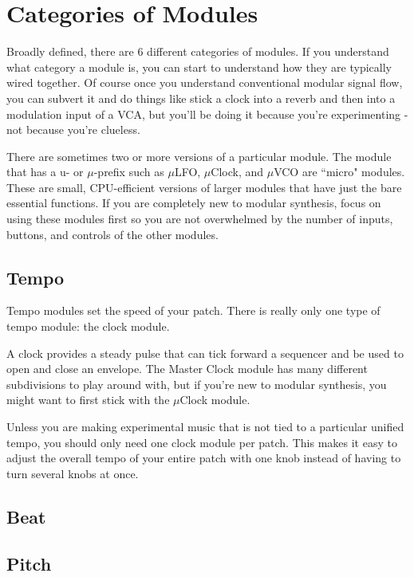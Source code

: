\documentclass[11pt]{book}
\begin{document}
\section{Categories of Modules}

Broadly defined, there are 6 different categories of modules. If you understand what category a module is, you can start to understand how they are typically wired together. Of course once you understand conventional modular signal flow, you can subvert it and do things like stick a clock into a reverb and then into a modulation input of a VCA, but you'll be doing it because you're experimenting - not because you're clueless.

There are sometimes two or more versions of a particular module. The module that has a u- or $\mu$-prefix such as $\mu$LFO, $\mu$Clock, and $\mu$VCO are ``micro" modules. These are small, CPU-efficient versions of larger modules that have just the bare essential functions. If you are completely new to modular synthesis, focus on using these modules first so you are not overwhelmed by the number of inputs, buttons, and controls of the other modules.

\subsection{Tempo}

Tempo modules set the speed of your patch. There is really only one type of tempo module: the clock module.

A clock provides a steady pulse that can tick forward a sequencer and be used to open and close an envelope. The Master Clock module has many different subdivisions to play around with, but if you're new to modular synthesis, you might want to first stick with the $\mu$Clock module.

Unless you are making experimental music that is not tied to a particular unified tempo, you should only need one clock module per patch. This makes it easy to adjust the overall tempo of your entire patch with one knob instead of having to turn several knobs at once.

\subsection{Beat}


\subsection{Pitch}
\end{document}
